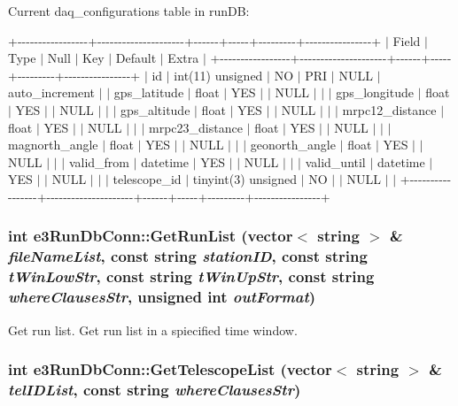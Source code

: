Current daq\_\-configurations table in runDB:

+-\/-\/-\/-\/-\/-\/-\/-\/-\/-\/-\/-\/-\/-\/-\/-\/-\/+-\/-\/-\/-\/-\/-\/-\/-\/-\/-\/-\/-\/-\/-\/-\/-\/-\/-\/-\/-\/-\/+-\/-\/-\/-\/-\/-\/+-\/-\/-\/-\/-\/+-\/-\/-\/-\/-\/-\/-\/-\/-\/+-\/-\/-\/-\/-\/-\/-\/-\/-\/-\/-\/-\/-\/-\/-\/-\/+ $|$ Field $|$ Type $|$ Null $|$ Key $|$ Default $|$ Extra $|$ +-\/-\/-\/-\/-\/-\/-\/-\/-\/-\/-\/-\/-\/-\/-\/-\/-\/+-\/-\/-\/-\/-\/-\/-\/-\/-\/-\/-\/-\/-\/-\/-\/-\/-\/-\/-\/-\/-\/+-\/-\/-\/-\/-\/-\/+-\/-\/-\/-\/-\/+-\/-\/-\/-\/-\/-\/-\/-\/-\/+-\/-\/-\/-\/-\/-\/-\/-\/-\/-\/-\/-\/-\/-\/-\/-\/+ $|$ id $|$ int(11) unsigned $|$ NO $|$ PRI $|$ NULL $|$ auto\_\-increment $|$ $|$ gps\_\-latitude $|$ float $|$ YES $|$ $|$ NULL $|$ $|$ $|$ gps\_\-longitude $|$ float $|$ YES $|$ $|$ NULL $|$ $|$ $|$ gps\_\-altitude $|$ float $|$ YES $|$ $|$ NULL $|$ $|$ $|$ mrpc12\_\-distance $|$ float $|$ YES $|$ $|$ NULL $|$ $|$ $|$ mrpc23\_\-distance $|$ float $|$ YES $|$ $|$ NULL $|$ $|$ $|$ magnorth\_\-angle $|$ float $|$ YES $|$ $|$ NULL $|$ $|$ $|$ geonorth\_\-angle $|$ float $|$ YES $|$ $|$ NULL $|$ $|$ $|$ valid\_\-from $|$ datetime $|$ YES $|$ $|$ NULL $|$ $|$ $|$ valid\_\-until $|$ datetime $|$ YES $|$ $|$ NULL $|$ $|$ $|$ telescope\_\-id $|$ tinyint(3) unsigned $|$ NO $|$ $|$ NULL $|$ $|$ +-\/-\/-\/-\/-\/-\/-\/-\/-\/-\/-\/-\/-\/-\/-\/-\/-\/+-\/-\/-\/-\/-\/-\/-\/-\/-\/-\/-\/-\/-\/-\/-\/-\/-\/-\/-\/-\/-\/+-\/-\/-\/-\/-\/-\/+-\/-\/-\/-\/-\/+-\/-\/-\/-\/-\/-\/-\/-\/-\/+-\/-\/-\/-\/-\/-\/-\/-\/-\/-\/-\/-\/-\/-\/-\/-\/+ \hypertarget{classe3RunDbConn_a42b34d56f7c154eb2132468996e476fd}{
\subsubsection[{GetRunList}]{\setlength{\rightskip}{0pt plus 5cm}int e3RunDbConn::GetRunList (vector$<$ string $>$ \& {\em fileNameList}, \/  const string {\em stationID}, \/  const string {\em tWinLowStr}, \/  const string {\em tWinUpStr}, \/  const string {\em whereClausesStr}, \/  unsigned int {\em outFormat})}}
\label{classe3RunDbConn_a42b34d56f7c154eb2132468996e476fd}


Get run list. Get run list in a spiecified time window. \hypertarget{classe3RunDbConn_a09fea2023c17c05ef1b3bcff2773ec3e}{
\subsubsection[{GetTelescopeList}]{\setlength{\rightskip}{0pt plus 5cm}int e3RunDbConn::GetTelescopeList (vector$<$ string $>$ \& {\em telIDList}, \/  const string {\em whereClausesStr})}}
\label{classe3RunDbConn_a09fea2023c17c05ef1b3bcff2773ec3e}


